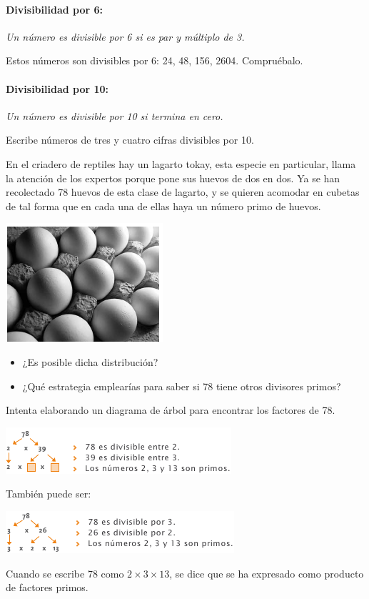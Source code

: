 \documentclass[10pt,twoside]{article}
\begin{document}
\paragraph*{Divisibilidad por 6:} \emph{Un número es divisible por 6 si es par y múltiplo de 3.}

Estos números son divisibles por 6: 24, 48, 156, 2604. Compruébalo.
\paragraph*{Divisibilidad por 10:} \emph{Un número es divisible por 10 si termina en cero.}

Escribe números de tres y cuatro cifras divisibles por 10.

\begin{minipage}{.55\textwidth}
 En el criadero de reptiles hay un lagarto tokay, esta especie
en particular, llama la atención de los expertos porque pone
sus huevos de dos en dos. Ya se han recolectado 78 huevos
de esta clase de lagarto, y se quieren acomodar en cubetas
de tal forma que en cada una de ellas haya un número primo
de huevos.
\end{minipage}
\begin{minipage}{.4\textwidth}
 \begin{center}
 \includegraphics[scale=.75]{./Images/huevos_02.png}
\end{center}
\end{minipage}
\begin{itemize}
 \item  ¿Es posible dicha distribución?
 \item ¿Qué estrategia emplearías para saber si 78 tiene otros divisores primos?
\end{itemize}
Intenta elaborando un diagrama de árbol para encontrar los factores de 78.
\begin{center}
 \includegraphics{./Images/diag_arbol.png}
\end{center}
También puede ser:
\begin{center}
 \includegraphics{./Images/diag_arbol_02.png}
\end{center}
Cuando se escribe 78 como $2 \times 3 \times 13$, se dice que se ha
expresado como producto de factores primos.
\end{document}
